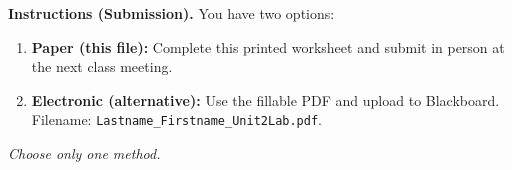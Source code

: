 \noindent\textbf{Instructions (Submission).} You have two options:
\begin{enumerate}[leftmargin=*]
  \item \textbf{Paper (this file):} Complete this printed worksheet and submit in person at the next class meeting.
  \item \textbf{Electronic (alternative):} Use the fillable PDF and upload to Blackboard. Filename: \texttt{Lastname\_Firstname\_Unit2Lab.pdf}.
\end{enumerate}
\textit{Choose only one method.}
